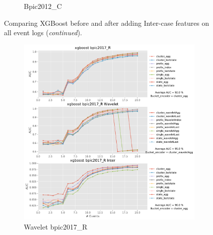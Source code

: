 \documentclass[twoside,11pt]{Latex/Classes/PhDthesisPSnPDF}
\begin{document}
\begin{figure}[!htbp]
\begin{subfigure}{0.48\textwidth}
		\caption{Bpic2012\_C} \label{fig:b12ci}
	\end{subfigure}	
	\caption{Comparing XGBoost before and after adding Inter-case features on all event logs  (\textit{continued}).}
\label{fig:interx2}
\end{figure}

\begin{figure}[!htbp] %

	\begin{subfigure}{0.48\textwidth}
		\includegraphics[width=\linewidth]{images/inter/xgboost/bpic2017_R.pdf}
		\caption{Wavelet bpic2017\_R} \label{fig:b17ri}
	\end{subfigure}\hspace*{\fill}
	\begin{subfigure}{0.48\textwidth}

\end{subfigure}
\end{figure}
\end{document}
